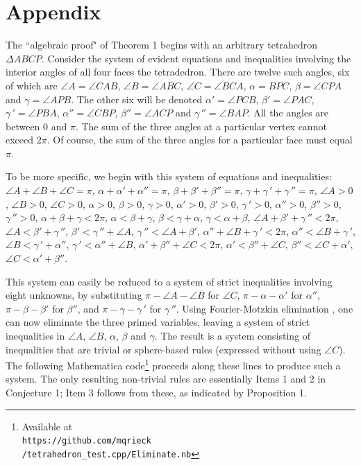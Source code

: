 \documentclass[a4paper, twoside]{article}
\begin{document}
\section{Appendix}

The ``algebraic proof" of Theorem 1 begins with an arbitrary tetrahedron $\Delta ABCP$. Consider the system of evident equations and inequalities involving the interior angles of all four faces the tetradedron. There are twelve such angles, six of which are $\angle A = \angle CAB$, $\angle B = \angle ABC$, $\angle C = \angle BCA$, $\alpha = BPC$, $\beta = \angle CPA$ and $\gamma = \angle APB$. The other six will be denoted $\alpha' = \angle PCB$, $\beta' = \angle PAC$, $\gamma\,' = \angle PBA$, $\alpha'' = \angle CBP$, $\beta'' = \angle ACP$ and $\gamma\,'' = \angle BAP$. 
All the angles are between 0 and $\pi$. The sum of the three angles at a particular vertex cannot exceed $2\pi$. Of course, the sum of the three angles for a particular face must equal $\pi$. 

To be more specific, we begin with this system of equations and inequalities: $\angle A + \angle B +\angle C = \pi$, $\alpha + \alpha' + \alpha'' = \pi$, $\beta + \beta' + \beta'' = \pi$, $\gamma + \gamma\,' + \gamma\,'' = \pi$, $\angle A > 0$, $\angle B > 0$, $\angle C > 0$, $\alpha > 0$, $\beta > 0$, $\gamma > 0$, $\alpha' > 0$, $\beta' > 0$, $\gamma\,' > 0$, $\alpha'' > 0$, $\beta'' > 0$, $\gamma\,'' > 0$, $\alpha + \beta + \gamma < 2\pi$, $\alpha < \beta + \gamma$, $\beta < \gamma + \alpha$, $\gamma < \alpha + \beta$, $\angle A + \beta' + \gamma\,'' < 2\pi$, $\angle A < \beta' + \gamma\,''$, $\beta' < \gamma\,'' + \angle A$, $\gamma\,'' < \angle A + \beta'$, 
$\alpha'' + \angle B + \gamma\,' < 2\pi$, $\alpha'' < \angle B + \gamma\,'$, $\angle B < \gamma\,' + \alpha''$, $\gamma\,' < \alpha'' + \angle B$, $\alpha' + \beta'' + \angle C < 2\pi$, $\alpha' < \beta'' + \angle C$, $\beta'' < \angle C + \alpha'$, $\angle C < \alpha' + \beta''$. 

This system can easily be reduced to a system of strict inequalities involving eight unknowns, by substituting $\pi - \angle A - \angle B$ for $\angle C$, $\pi - \alpha - \alpha'$ for $\alpha''$, $\pi - \beta - \beta'$ for $\beta''$, and $\pi - \gamma - \gamma\,'$ for $\gamma\,''$. Using Fourier-Motzkin elimination \cite{DE}, one can now eliminate the three primed variables, leaving a system of strict inequalities in $\angle A$, $\angle B$, $\alpha$, $\beta$ and $\gamma$. The result is a system consisting of inequalities that are trivial or sphere-based rules (expressed without using $\angle C$). The following Mathematica code\footnote{Available at\\ {\small \tt https://github.com/mqrieck\\/tetrahedron\_test.cpp/Eliminate.nb}} proceeds along these lines to produce such a system. The only resulting non-trivial rules are essentially Items 1 and 2 in Conjecture 1; Item 3 follows from these, as indicated by Proposition 1. \\ 
\end{document}
